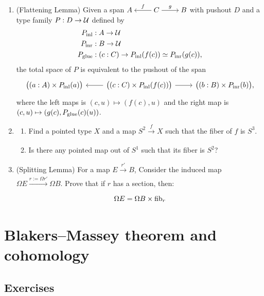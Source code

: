 \documentclass[10pt,oneside,leqno,openright]{memoir}
\begin{document}
\begin{enumerate}
 \item \label{flattening} (Flattening Lemma)
  Given a span $\begin{tikzcd}[cramped]
    A & C\ar[l,"f"']\ar[r,"g"] & B
  \end{tikzcd}$ with pushout $D$ and a type family $P : D \to \mathcal{U}$ defined by
  \begin{align*}
    P_{\operatorname{inl}} &: A \to \mathcal{U} \\
    P_{\operatorname{inr}} &: B \to \mathcal{U} \\
    P_{\operatorname{glue}} &: (c:C) \to P_{\operatorname{inl}}(f(c)) \simeq P_{\operatorname{inr}}(g(c)),
  \end{align*}
  the total space of $P$ is equivalent to the pushout of the span
  \[
    \begin{tikzcd}
      \bigl((a:A)\times P_{\inl}(a)\bigr) &
      \bigl((c:C)\times P_{\inl}(f(c))\bigr) \ar[l]\ar[r] &
      \bigl((b:B)\times P_{\inr}(b)\bigr),
    \end{tikzcd}
  \]
  where the left maps is $(c,u)\mapsto(f(c),u)$ and the right map is
  $(c,u)\mapsto(g(c),P_{\operatorname{glue}}(c)(u))$.
  \item  
  \begin{enumerate}
  [label=(\roman*)]
      \item Find a pointed type $X$ and a map $S^2 \xrightarrow[]{f} X$ such that the fiber of $f$ is $S^3$.
   \item   Is there any pointed map out of $S^1$ such that its fiber is $S^2$? 
  \end{enumerate}

 
\item \label{splitting lemma} (Splitting Lemma) For a map $E \xrightarrow[]{r'} B $, Consider the induced map $\Omega E \xrightarrow[]{r:=\Omega r'} \Omega B$. Prove that if $r$ has a section, then:
$$
\Omega E = \Omega B \times \operatorname{fib}_r
$$


\end{enumerate}

\chapter[Blakers--Massey theorem and cohomology]{Blakers--Massey theorem and cohomology}
\label{ch:pushouts}

\section{Exercises}
\end{document}
